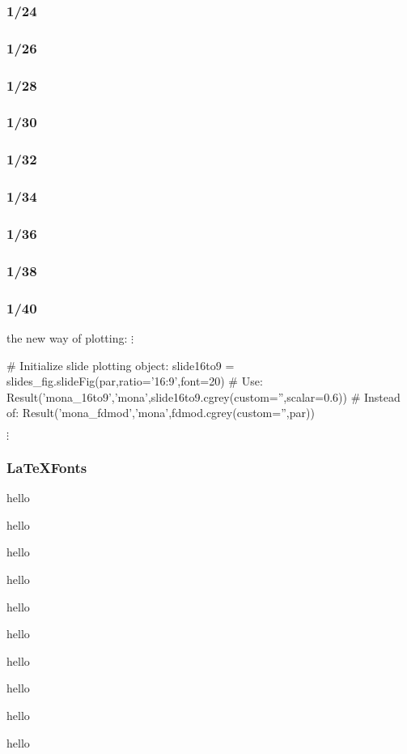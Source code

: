 \begin{frame}\frametitle{1/24}
\end{frame}

\begin{frame}\frametitle{1/26}
\end{frame}

\begin{frame}\frametitle{1/28}
\end{frame}

\begin{frame}\frametitle{1/30}
\end{frame}

\begin{frame}\frametitle{1/32}
\end{frame}

\begin{frame}\frametitle{1/34}
\end{frame}

\begin{frame}\frametitle{1/36}
\end{frame}

\begin{frame}\frametitle{1/38}
\end{frame}

\begin{frame}\frametitle{1/40}
\end{frame}

\begin{frame}
\end{frame}
\begin{frame}[fragile]{the new way of plotting:}
\centering
$\vdots$
\begin{python}
# Initialize slide plotting object:
slide16to9 = slides_fig.slideFig(par,ratio='16:9',font=20) 
# Use:
Result('mona_16to9','mona',slide16to9.cgrey(custom='',scalar=0.6)) 
# Instead of:
Result('mona_fdmod','mona',fdmod.cgrey(custom='',par))
\end{python}
$\vdots$

\end{frame}


\usebackgroundtemplate{}
\begin{frame}\frametitle{\LaTeX Fonts}
\tiny hello

\scriptsize hello

\footnotesize hello

\small hello

\normalsize hello

\large hello

\Large hello

\LARGE hello

\huge hello

\Huge hello
\end{frame}





